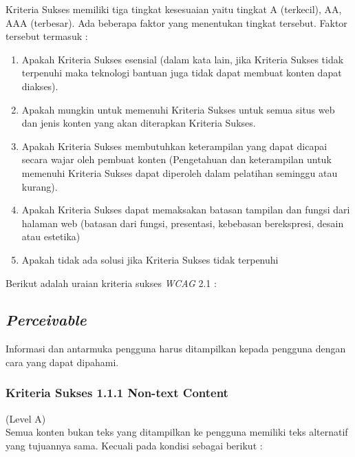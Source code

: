 Kriteria Sukses memiliki tiga tingkat kesesuaian yaitu tingkat A (terkecil), AA, AAA (terbesar). Ada beberapa faktor yang menentukan tingkat tersebut. Faktor tersebut termasuk :

\begin{enumerate}
	\item Apakah Kriteria Sukses esensial (dalam kata lain, jika Kriteria Sukses tidak terpenuhi maka teknologi bantuan juga tidak dapat membuat konten dapat diakses).
	\item Apakah mungkin untuk memenuhi Kriteria Sukses untuk semua situs web dan jenis konten yang akan diterapkan Kriteria Sukses.
	\item Apakah Kriteria Sukses membutuhkan keterampilan yang dapat dicapai secara wajar oleh pembuat konten (Pengetahuan dan keterampilan untuk memenuhi Kriteria Sukses dapat diperoleh dalam pelatihan seminggu atau kurang).
	\item Apakah Kriteria Sukses dapat memaksakan batasan tampilan dan fungsi dari halaman web (batasan dari fungsi, presentasi, kebebasan berekspresi, desain atau estetika)
	\item Apakah tidak ada solusi jika Kriteria Sukses tidak terpenuhi
\end{enumerate}

Berikut adalah uraian kriteria sukses \textit{WCAG} 2.1 :

\subsection{\textit{Perceivable}}
Informasi dan antarmuka pengguna harus ditampilkan kepada pengguna dengan cara yang dapat dipahami.

\subsubsection{Kriteria Sukses 1.1.1 Non-text Content}
\label{sec:kriteria_1.1.1}
(Level A)\\

Semua konten bukan teks yang ditampilkan ke pengguna memiliki teks alternatif yang tujuannya sama. Kecuali pada kondisi sebagai berikut :

